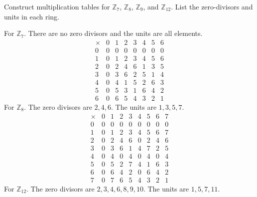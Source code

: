   \begin{exercise}[Shifrin 1.4.1] 
    Construct multiplication tables for $\mathbb{Z}_7$, $\mathbb{Z}_8$, $\mathbb{Z}_9$, and $\mathbb{Z}_{12}$. List the zero-divisors and units in each ring.
  \end{exercise}
  \begin{solution}
    For $\mathbb{Z}_7$. There are no zero divisors and the units are all elements. 
    \begin{equation}
      \begin{array}{c|ccccccc}
        \times & 0 & 1 & 2 & 3 & 4 & 5 & 6 \\
        \hline
        0 & 0 & 0 & 0 & 0 & 0 & 0 & 0 \\
        1 & 0 & 1 & 2 & 3 & 4 & 5 & 6 \\
        2 & 0 & 2 & 4 & 6 & 1 & 3 & 5 \\
        3 & 0 & 3 & 6 & 2 & 5 & 1 & 4 \\
        4 & 0 & 4 & 1 & 5 & 2 & 6 & 3 \\
        5 & 0 & 5 & 3 & 1 & 6 & 4 & 2 \\
        6 & 0 & 6 & 5 & 4 & 3 & 2 & 1
      \end{array}
    \end{equation}
    For $\mathbb{Z}_8$. The zero divisors are $2, 4, 6$. The units are $1, 3, 5, 7$. 
    \begin{equation}
      \begin{array}{c|cccccccc}
        \times & 0 & 1 & 2 & 3 & 4 & 5 & 6 & 7 \\
        \hline
        0 & 0 & 0 & 0 & 0 & 0 & 0 & 0 & 0 \\
        1 & 0 & 1 & 2 & 3 & 4 & 5 & 6 & 7 \\
        2 & 0 & 2 & 4 & 6 & 0 & 2 & 4 & 6 \\
        3 & 0 & 3 & 6 & 1 & 4 & 7 & 2 & 5 \\
        4 & 0 & 4 & 0 & 4 & 0 & 4 & 0 & 4 \\
        5 & 0 & 5 & 2 & 7 & 4 & 1 & 6 & 3 \\
        6 & 0 & 6 & 4 & 2 & 0 & 6 & 4 & 2 \\
        7 & 0 & 7 & 6 & 5 & 4 & 3 & 2 & 1
      \end{array} 
    \end{equation}
    For $\mathbb{Z}_{12}$. The zero divisors are $2, 3, 4, 6, 8, 9, 10$. The units are $1, 5, 7, 11$. 
    \begin{equation}
      \begin{array}{c|cccccccccccc}

\end{array}
\end{equation}
\end{solution}
